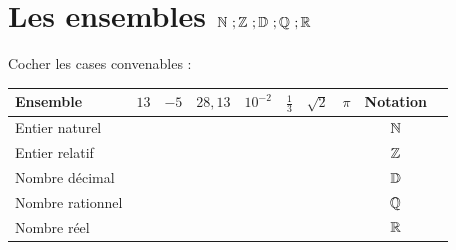 \documentclass[10pt, a4paper]{article}
\begin{document}
\pagestyle{cours}
\pagestyle{cours}


\section{Les ensembles $\mathbb{N} ~; \mathbb{Z} ~; \mathbb{D} ~; \mathbb{Q} ~; \mathbb{R}$ }


\begin{Activite}[][15 min]
Cocher les cases convenables :
\medskip
\renewcommand{\arraystretch}{1.5}
\begin{center}
\begin{tabular}{|l|c|c|c|c|c|c|c|c|c|}
\hline
\textbf{\textcolor{PrimaryColor}{Ensemble}}
  & $13$
  & $-5$
  & $28{,}13$
  & $10^{-2}$
  & $\frac{1}{3}$
  & $\sqrt{2}$
  & $\pi$
  & \textbf{\textcolor{PrimaryColor}{Notation}} \\
\hline
Entier naturel  & & & & & & & &  $\mathbb{N}$ \\
\hline
Entier relatif    & & & & & & &  & $\mathbb{Z}$ \\
\hline
Nombre décimal    & & & & & & &  & $\mathbb{D}$ \\
\hline
Nombre rationnel  & & & & & & &  & $\mathbb{Q}$ \\
\hline
Nombre réel       & & & & & & &  & $\mathbb{R}$ \\
\hline
\end{tabular}
\end{center}
\renewcommand{\arraystretch}{1}
\end{Activite}
\end{document}
